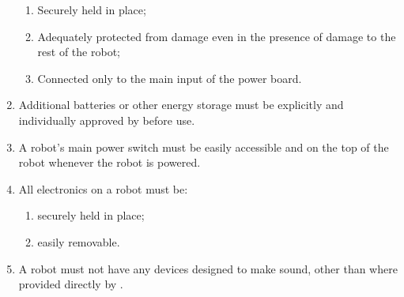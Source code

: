 \begin{enumerate}
  \begin{enumerate}
    \item Securely held in place;
    \item Adequately protected from damage even in the presence of damage to the
          rest of the robot;
    \item Connected only to the main input of the power board.
  \end{enumerate}
\item Additional batteries or other energy storage must be explicitly and
     individually approved by \org before use.
\item A robot's main power switch must be easily accessible and on the top of
      the robot whenever the robot is powered.
\item All electronics on a robot must be:
  \begin{enumerate}
    \item securely held in place;
    \item easily removable.
  \end{enumerate}
\item A robot must not have any devices designed to make sound, other than
      where provided directly by \org{}.
\end{enumerate}
